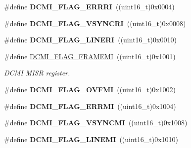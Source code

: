 \begin{DoxyCompactItemize}
\item 
\hypertarget{group___d_c_m_i___flags_ga38108fd82e34f856f2cc2289d5809143}{\#define {\bfseries D\-C\-M\-I\-\_\-\-F\-L\-A\-G\-\_\-\-E\-R\-R\-R\-I}~((uint16\-\_\-t)0x0004)}\label{group___d_c_m_i___flags_ga38108fd82e34f856f2cc2289d5809143}

\item 
\hypertarget{group___d_c_m_i___flags_ga684fd8d6f4d02ec7e9113a5a4caa6484}{\#define {\bfseries D\-C\-M\-I\-\_\-\-F\-L\-A\-G\-\_\-\-V\-S\-Y\-N\-C\-R\-I}~((uint16\-\_\-t)0x0008)}\label{group___d_c_m_i___flags_ga684fd8d6f4d02ec7e9113a5a4caa6484}

\item 
\hypertarget{group___d_c_m_i___flags_ga291eae13e645d5303690dc07a8cfcfde}{\#define {\bfseries D\-C\-M\-I\-\_\-\-F\-L\-A\-G\-\_\-\-L\-I\-N\-E\-R\-I}~((uint16\-\_\-t)0x0010)}\label{group___d_c_m_i___flags_ga291eae13e645d5303690dc07a8cfcfde}

\item 
\hypertarget{group___d_c_m_i___flags_gad6373f50f9681c59b0406c8c1ae3aac1}{\#define \hyperlink{group___d_c_m_i___flags_gad6373f50f9681c59b0406c8c1ae3aac1}{D\-C\-M\-I\-\_\-\-F\-L\-A\-G\-\_\-\-F\-R\-A\-M\-E\-M\-I}~((uint16\-\_\-t)0x1001)}\label{group___d_c_m_i___flags_gad6373f50f9681c59b0406c8c1ae3aac1}

\begin{DoxyCompactList}\small\item\em D\-C\-M\-I M\-I\-S\-R register. \end{DoxyCompactList}\item 
\hypertarget{group___d_c_m_i___flags_gaec0c82ddcc3994b877a2f904c680e2b1}{\#define {\bfseries D\-C\-M\-I\-\_\-\-F\-L\-A\-G\-\_\-\-O\-V\-F\-M\-I}~((uint16\-\_\-t)0x1002)}\label{group___d_c_m_i___flags_gaec0c82ddcc3994b877a2f904c680e2b1}

\item 
\hypertarget{group___d_c_m_i___flags_ga32d9f0793f2c0758c05e07e273251e96}{\#define {\bfseries D\-C\-M\-I\-\_\-\-F\-L\-A\-G\-\_\-\-E\-R\-R\-M\-I}~((uint16\-\_\-t)0x1004)}\label{group___d_c_m_i___flags_ga32d9f0793f2c0758c05e07e273251e96}

\item 
\hypertarget{group___d_c_m_i___flags_ga9933cab890dbebea51db4aa71a11f90d}{\#define {\bfseries D\-C\-M\-I\-\_\-\-F\-L\-A\-G\-\_\-\-V\-S\-Y\-N\-C\-M\-I}~((uint16\-\_\-t)0x1008)}\label{group___d_c_m_i___flags_ga9933cab890dbebea51db4aa71a11f90d}

\item 
\hypertarget{group___d_c_m_i___flags_ga9c409d7ee355083e9b73f267f94d44e3}{\#define {\bfseries D\-C\-M\-I\-\_\-\-F\-L\-A\-G\-\_\-\-L\-I\-N\-E\-M\-I}~((uint16\-\_\-t)0x1010)}\label{group___d_c_m_i___flags_ga9c409d7ee355083e9b73f267f94d44e3}


\end{DoxyCompactItemize}
